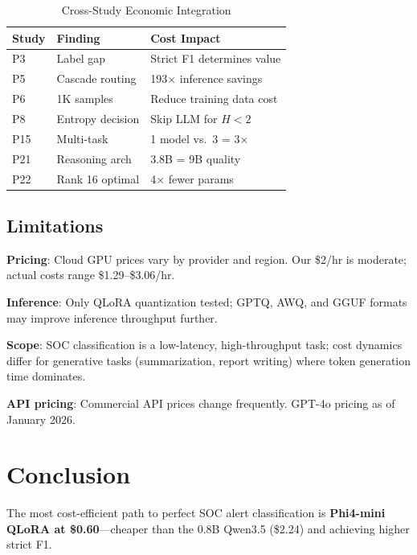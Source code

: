 \documentclass[review,3p]{elsarticle}
\begin{document}
\begin{table}[!ht]
\centering
\caption{Cross-Study Economic Integration}
\label{tab:cross}
\begin{tabular}{lll}
\toprule
\textbf{Study} & \textbf{Finding} & \textbf{Cost Impact} \\
\midrule
P3~\cite{p3} & Label gap & Strict F1 determines value \\
P5~\cite{p5} & Cascade routing & 193$\times$ inference savings \\
P6~\cite{p6} & 1K samples & Reduce training data cost \\
P8~\cite{p8} & Entropy decision & Skip LLM for $H<2$ \\
P15~\cite{p15} & Multi-task & 1 model vs.\ 3 = 3$\times$ \\
P21~\cite{p21} & Reasoning arch & 3.8B = 9B quality \\
P22~\cite{p22} & Rank 16 optimal & 4$\times$ fewer params \\
\bottomrule
\end{tabular}
\end{table}

\subsection{Limitations}
\textbf{Pricing}: Cloud GPU prices vary by provider and region. Our \$2/hr is moderate; actual costs range \$1.29--\$3.06/hr.

\textbf{Inference}: Only QLoRA quantization tested; GPTQ, AWQ, and GGUF formats may improve inference throughput further.

\textbf{Scope}: SOC classification is a low-latency, high-throughput task; cost dynamics differ for generative tasks (summarization, report writing) where token generation time dominates.

\textbf{API pricing}: Commercial API prices change frequently. GPT-4o pricing as of January 2026.

\section{Conclusion}

The most cost-efficient path to perfect SOC alert classification is \textbf{Phi4-mini QLoRA at \$0.60}---cheaper than the 0.8B Qwen3.5 (\$2.24) and achieving higher strict F1.
\end{document}
